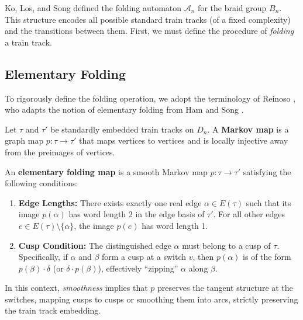 Ko, Los, and Song \cite{SongEntropy} defined the folding automaton $\mathcal{A}_n$ for the braid group $B_n$. This structure encodes all possible standard train tracks (of a fixed complexity) and the transitions between them. First, we must define the procedure of \emph{folding} a train track.

\subsection{Elementary Folding}
\label{subsec:elementary_folding}

To rigorously define the folding operation, we adopt the terminology of Reinoso \cite{reinoso2024pseudo}, who adapts the notion of elementary folding from Ham and Song \cite{HamSong2007}.

\begin{definition}
    Let $\tau$ and $\tau'$ be standardly embedded train tracks on $D_n$. A \textbf{Markov map} is a graph map $p: \tau \to \tau'$ that maps vertices to vertices and is locally injective away from the preimages of vertices.
\end{definition}

\begin{definition}\label{def:elementary_folding_map}
    An \textbf{elementary folding map} is a smooth Markov map $p: \tau \to \tau'$ satisfying the following conditions:
    \begin{enumerate}
        \item \textbf{Edge Lengths:} There exists exactly one real edge $\alpha \in E(\tau)$ such that its image $p(\alpha)$ has word length 2 in the edge basis of $\tau'$. For all other edges $e \in E(\tau) \setminus \{\alpha\}$, the image $p(e)$ has word length 1.
        \item \textbf{Cusp Condition:} The distinguished edge $\alpha$ must belong to a cusp of $\tau$. Specifically, if $\alpha$ and $\beta$ form a cusp at a switch $v$, then $p(\alpha)$ is of the form $p(\beta) \cdot \delta$ (or $\delta \cdot p(\beta)$), effectively ``zipping'' $\alpha$ along $\beta$.
    \end{enumerate}
\end{definition}

In this context, \textit{smoothness} implies that $p$ preserves the tangent structure at the switches, mapping cusps to cusps or smoothing them into arcs, strictly preserving the train track embedding.

